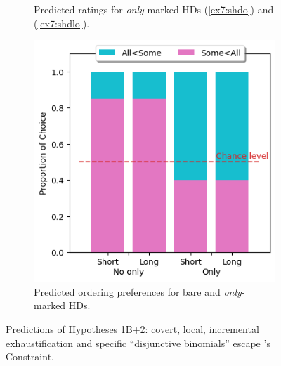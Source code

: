 \begin{figure}[H]
\begin{subfigure}[b]{.3\linewidth}
		\caption[]{Predicted ratings for \textit{only}-marked HDs (\ref{ex7:shdo}) and (\ref{ex7:shdlo}).}
	\end{subfigure}
	\hfill
	\begin{subfigure}[b]{.3\linewidth}
		\centering
		\includegraphics[width=\linewidth]{./pred-1b-pref.png}
		\caption[]{Predicted ordering preferences for bare and \textit{only}-marked HDs.}
	\end{subfigure}
	\caption[]{Predictions of Hypotheses 1B+2: covert, local, incremental exhaustification and specific ``disjunctive binomials'' escape \citeauthor{Hurford1974}'s Constraint.}\label{fig7:predictions-exh-incr-freq}
\end{figure} 



